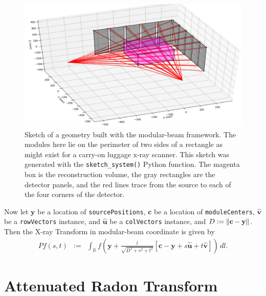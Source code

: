 \documentclass[11pt]{article}
\begin{document}
\begin{figure}[h]
\begin{center}
\includegraphics[scale=0.5]{modularBeam}
\end{center}
\caption{Sketch of a geometry built with the modular-beam framework.  The modules here lie on the perimeter of two sides of a rectangle as might exist for a carry-on luggage x-ray scanner.  This sketch was generated with the \texttt{sketch\_system()} Python function.  The  magenta box is the reconstruction volume, the gray rectangles are the detector panels, and the red lines trace from the source to each of the four corners of the detector.} \label{fig:modularBeamSketch}
\end{figure}

Now let $\bm{y}$ be a location of \texttt{sourcePositions}, $\bm{c}$ be a location of \texttt{moduleCenters}, $\bm{\widehat{v}}$ be a \texttt{rowVectors} instance, and $\bm{\widehat{u}}$ be a \texttt{colVectors} instance, and $D := \|\textbf{c}-\textbf{y}\|$. Then the X-ray Transform in modular-beam coordinate is given by
\begin{eqnarray*}
Pf(s,t) &:=& \int_{\mathbb{R}} f\left( \bm{y} + \frac{l}{\sqrt{D^2 + s^2 + t^2}}\left[ \bm{c}-\bm{y} + s\bm{\widehat{u}} + t\bm{\widehat{v}} \right] \right) \, dl.
\end{eqnarray*}


\section{Attenuated Radon Transform} \label{sec:ART}
\end{document}
